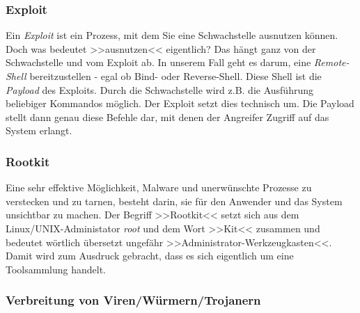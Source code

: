 \subsubsection{Exploit}
\label{sec:Exploit}

Ein \textit{Exploit} ist ein Prozess, mit dem Sie eine Schwachstelle ausnutzen können. Doch was bedeutet >>ausnutzen<< eigentlich? Das hängt ganz von der Schwachstelle und vom Exploit ab. In unserem Fall geht es darum, eine \textit{Remote-Shell} bereitzustellen - egal ob Bind- oder Reverse-Shell. Diese Shell ist die \textit{Payload} des Exploits. Durch die Schwachstelle wird z.B. die Ausführung beliebiger Kommandos möglich. Der Exploit setzt dies technisch um. Die Payload stellt dann genau diese Befehle dar, mit denen der Angreifer Zugriff auf das System erlangt.

\subsubsection{Rootkit}
\label{sec:Rootkit}

Eine sehr effektive Möglichkeit, Malware und unerwünschte Prozesse zu verstecken und zu tarnen, besteht darin, sie für den Anwender und das System unsichtbar zu machen. Der Begriff >>Rootkit<< setzt sich aus dem Linux/UNIX-Administator \textit{root} und dem Wort >>Kit<< zusammen und bedeutet wörtlich übersetzt ungefähr >>Administrator-Werkzeugkasten<<. Damit wird zum Ausdruck gebracht, dass es sich eigentlich um eine Toolsammlung handelt.

\subsubsection{Verbreitung von Viren/Würmern/Trojanern}
\label{sec:VerbreitungVirenWuermerTrojaner}


